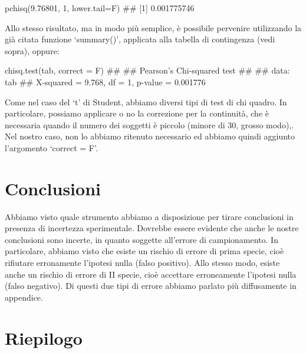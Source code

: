 \documentclass[a4paper,12pt,oneside]{book}
\newenvironment{Shaded}{}{}
\newcommand{\KeywordTok}[1]{#1}
\newcommand{\DataTypeTok}[1]{#1}
\newcommand{\DecValTok}[1]{#1}
\newcommand{\FloatTok}[1]{#1}
\newcommand{\CommentTok}[1]{#1}
\newcommand{\NormalTok}[1]{#1}
\begin{document}
\begin{Shaded}
\begin{Highlighting}[]
\KeywordTok{pchisq}\NormalTok{(}\FloatTok{9.76801}\NormalTok{, }\DecValTok{1}\NormalTok{, }\DataTypeTok{lower.tail=}\NormalTok{F)}
\CommentTok{## [1] 0.001775746}
\end{Highlighting}
\end{Shaded}

Allo stesso risultato, ma in modo più semplice, è possibile pervenire utilizzando la già citata funzione `summary()', applicata alla tabella di contingenza (vedi sopra), oppure:

\begin{Shaded}
\begin{Highlighting}[]
\KeywordTok{chisq.test}\NormalTok{(tab, }\DataTypeTok{correct =}\NormalTok{ F)}
\CommentTok{## }
\CommentTok{##  Pearson's Chi-squared test}
\CommentTok{## }
\CommentTok{## data:  tab}
\CommentTok{## X-squared = 9.768, df = 1, p-value = 0.001776}
\end{Highlighting}
\end{Shaded}

Come nel caso del `t' di Student, abbiamo diversi tipi di test di chi quadro. In particolare, possiamo applicare o no la correzione per la continuità, che è necessaria quando il numero dei soggetti è piccolo (minore di 30, grosso modo),. Nel nostro caso, non lo abbiamo ritenuto necessario ed abbiamo quindi aggiunto l'argomento `correct = F'.

\hypertarget{conclusioni-1}{%
\section{Conclusioni}\label{conclusioni-1}}

Abbiamo visto quale strumento abbiamo a disposizione per tirare conclusioni in presenza di incertezza sperimentale. Dovrebbe essere evidente che anche le nostre conclusioni sono incerte, in quanto soggette all'errore di campionamento. In particolare, abbiamo visto che esiste un rischio di errore di prima specie, cioè rifiutare erronamente l'ipotesi nulla (falso positivo). Allo stesso modo, esiste anche un rischio di errore di II specie, cioè accettare erroneamente l'ipotesi nulla (falso negativo). Di questi due tipi di errore abbiamo parlato più diffusamente in appendice.

\hypertarget{riepilogo}{%
\section{Riepilogo}\label{riepilogo}}
\end{document}
